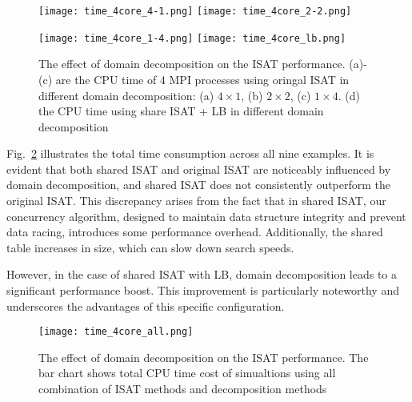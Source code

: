 \begin{figure}[htbp]
	\centering
	\texttt{[image: time\_4core\_4-1.png]}
	\texttt{[image: time\_4core\_2-2.png]}

	\texttt{[image: time\_4core\_1-4.png]}
	\texttt{[image: time\_4core\_lb.png]}
	\caption{The effect of domain decomposition on the ISAT performance. (a)-(c) are the CPU time of 4 MPI processes using oringal ISAT in different domain decomposition: (a) $4\times1$, (b) $2\times2$, (c) $1\times4$. (d) the CPU time using share ISAT + LB in different domain decomposition}\label{MPI_4core}
\end{figure}


Fig.~\ref{MPI_4core_all} illustrates the total time consumption across all nine examples. It is evident that both shared ISAT and original ISAT are noticeably influenced by domain decomposition, and shared ISAT does not consistently outperform the original ISAT. This discrepancy arises from the fact that in shared ISAT, our concurrency algorithm, designed to maintain data structure integrity and prevent data racing, introduces some performance overhead. Additionally, the shared table increases in size, which can slow down search speeds.

However, in the case of shared ISAT with LB, domain decomposition leads to a significant performance boost. This improvement is particularly noteworthy and underscores the advantages of this specific configuration.


\begin{figure}[htbp]
	\centering
	\texttt{[image: time\_4core\_all.png]}

	\caption{The effect of domain decomposition on the ISAT performance. The bar chart shows total CPU time cost of simualtions using all combination of ISAT methods and decomposition methods}\label{MPI_4core_all}
\end{figure}






